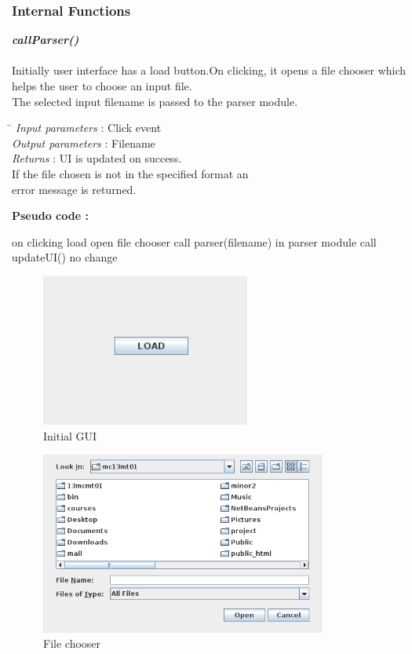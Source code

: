 \documentclass[a4paper,11pt]{article}
\begin{document}
\subsubsection{Internal Functions}
\emph{\bf callParser()}\\\\
Initially user interface has a load button.On clicking, it opens a file chooser which helps  the user to choose an input file.
\\ 
The selected input filename is passed to the parser module. \\
\begin{tabbing}
\hspace*{4cm}\= \kill
\emph{Input parameters} \>: Click event \\
\emph{Output parameters} \>: Filename \\
\emph{Returns} \>: UI is updated on success.\\ \>If the file chosen is not in the  specified format an\\ \> error message is returned.\\
\end{tabbing}
\textbf{Pseudo code :}
\begin{algorithmic}[1]
 \STATE on clicking load
 \STATE open file chooser
  \STATE call parser(filename) in parser module
  \STATE call updateUI()
  \ELSE 
  \STATE no change
  \ENDIF
 \end{algorithmic}
\begin{figure}[ht!]
\centering
\includegraphics[height=5cm]{images/1.png}
\caption{Initial GUI}
\end{figure}
\begin{figure}[h]
\centering
\includegraphics[height=6cm]{images/2.png}
\caption{File chooser}
\end{figure}
\end{document}
